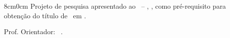 \newpage

\setcounter{page}{1}

\begin{center}

\MakeUppercase{\textbf{\universidade}}

\MakeUppercase{\textbf{\campus}}

\MakeUppercase{\textbf{\instituto}}

\MakeUppercase{\textbf{\curso}}

\vspace{2cm}

\MakeUppercase{\textbf{\autor}}

\vspace{2cm}

\MakeUppercase{\textbf{\titulo}}


\vspace{1.5cm}
    
\end{center}

\begin{adjustwidth}{8cm}{0cm}
    Projeto de pesquisa apresentado ao \curso \ – \sigla, \campus, como pré-requisito para obtenção do título de \ensino \ em \nomecurso.
    
    Prof. Orientador: \titulacao \ \orientador.
\end{adjustwidth}

\begin{center}

\vspace{4cm}

\MakeUppercase{\textbf{\local}}

\MakeUppercase{\textbf{\ano}}
    
\end{center}